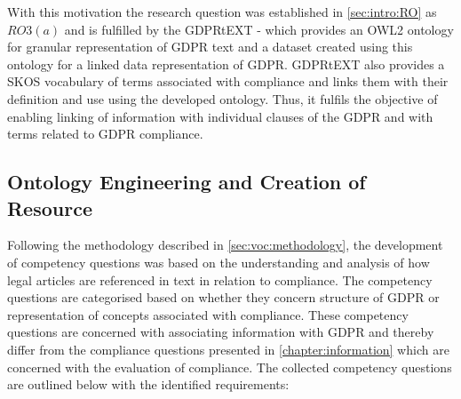 With this motivation the research question was established in \autoref{sec:intro:RO} as $RO3(a)$ and is fulfilled by the GDPRtEXT - which provides an OWL2 ontology for granular representation of GDPR text and a dataset created using this ontology for a linked data representation of GDPR. GDPRtEXT also provides a SKOS vocabulary of terms associated with compliance and links them with their definition and use using the developed ontology. Thus, it fulfils the objective of enabling linking of information with individual clauses of the GDPR and with terms related to GDPR compliance.

\subsection{Ontology Engineering and Creation of Resource}\label{sec:voc:gdprtext-engineering}
Following the methodology described in \autoref{sec:voc:methodology}, the development of competency questions was based on the understanding and analysis of how legal articles are referenced in text in relation to compliance. The competency questions are categorised based on whether they concern structure of GDPR or representation of concepts associated with compliance. These competency questions are concerned with associating information with GDPR and thereby differ from the compliance questions presented in \autoref{chapter:information} which are concerned with the evaluation of compliance. The collected competency questions are outlined below with the identified requirements:

